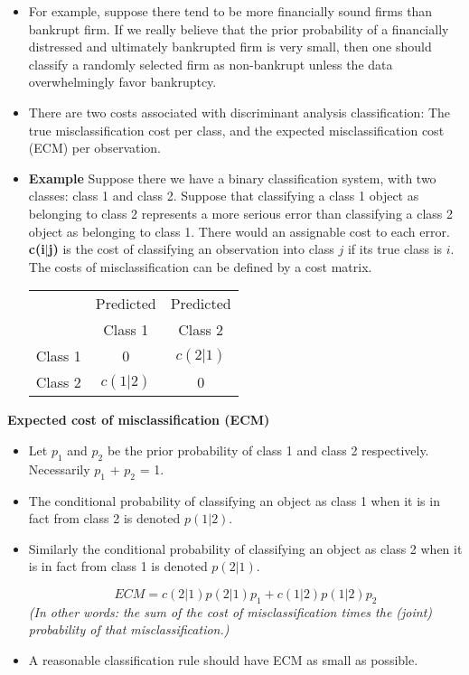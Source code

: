 \documentclass[a4paper,12pt]{article}
\begin{document}
\begin{itemize}
	\item 	For example, suppose there tend to be more financially sound firms than bankrupt
	firm. If we really believe that the prior probability of a financially
	distressed and ultimately bankrupted firm is very small, then one should
	classify a randomly selected firm as non-bankrupt unless the data
	overwhelmingly favor bankruptcy.
	
	
	
	\item 	There are two costs associated with discriminant analysis classification: The true misclassification cost per class, and the expected misclassification cost (ECM) per observation.
	
	\item 	\textbf{Example} Suppose there we have a binary classification system, with two classes: class 1 and class 2.
	Suppose that classifying a class 1 object as belonging to class 2 represents a more serious error than classifying a class 2 object as belonging to class 1. There would an assignable cost to each error.
	\textbf{c(i$|$j)} is the cost of classifying an observation into class $j$ if its true class is $i$.
	The costs of misclassification can be defined by a cost matrix.
	
	\begin{center}
	\begin{tabular}{|c|c|c|}
		\hline
		& Predicted & Predicted \\
		& Class 1 & Class 2 \\  \hline
		Class 1 & 0 & $c(2|1)$  \\ \hline
		Class 2 & $c(1|2)$ & 0 \\
		\hline
	\end{tabular}
	\end{center}
	
\end{itemize}

\noindent \textbf{Expected cost of misclassification (ECM)}
\begin{itemize}
	\item Let $p_1$ and $p_2$ be the prior probability of class 1 and class 2 respectively.
	Necessarily $p_1$ + $p_2$ = 1.
	
\item	The conditional probability of classifying an object as class 1 when it is in fact from
	class 2 is denoted $p(1|2)$.
\item 	Similarly the conditional probability of classifying an object as class 2 when it is in
	fact from class 1 is denoted $p(2|1)$.
	
	\[ECM = c(2|1)p(2|1)p_1 + c(1|2)p(1|2)p_2\]
\textit{(In other words: the sum of the cost of misclassification times the (joint) probability of that misclassification.)}
	
\item 	A reasonable classification rule should have ECM as small as possible.
\end{itemize}
\end{document}
